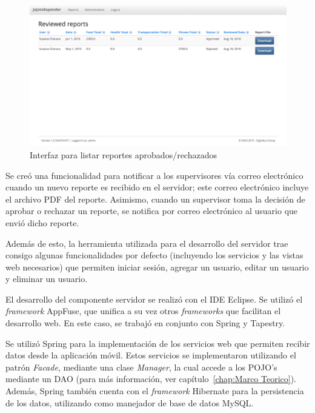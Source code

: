 \begin{figure}[ht]
  \centering
  \includegraphics[scale=0.38,type=png,ext=.png,read=.png]{imagenes/reviewed_reports}
  \captionsetup{justification=centering}
  \caption{Interfaz para listar reportes aprobados/rechazados}
  \label{fig:interfazListarReportesRevisados}
\end{figure}


Se creó una funcionalidad para notificar a los supervisores vía correo electrónico cuando un nuevo reporte es recibido en el servidor; este correo electrónico incluye el archivo PDF del reporte. Asimismo, cuando un supervisor toma la decisión de aprobar o rechazar un reporte, se notifica por correo electrónico al usuario que envió dicho reporte.

Además de esto, la herramienta utilizada para el desarrollo del servidor trae consigo algunas funcionalidades por defecto (incluyendo los servicios y las vistas web necesarios) que permiten iniciar sesión, agregar un usuario, editar un usuario y eliminar un usuario. 

El desarrollo del componente servidor se realizó con el IDE Eclipse. Se utilizó el \textit{framework} AppFuse, que unifica a su vez otros \textit{frameworks} que facilitan el desarrollo web. En este caso, se trabajó en conjunto con Spring y Tapestry.

Se utilizó Spring para la implementación de los servicios web que permiten recibir datos desde la aplicación móvil. Estos servicios se implementaron utilizando el patrón \textit{Facade}, mediante una clase \textit{Manager}, la cual accede a los POJO's mediante un DAO (para más información, ver capítulo~\ref{chap:Marco Teorico}). Además, Spring también cuenta con el \textit{framework} Hibernate para la persistencia de los datos, utilizando como manejador de base de datos MySQL.

